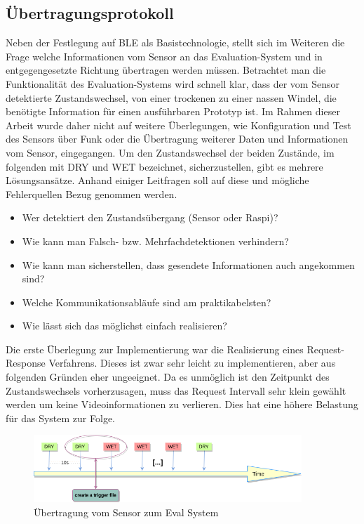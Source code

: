 \subsection{Übertragungsprotokoll}
\label{subsubsec:unser_protokoll}

Neben der Festlegung auf BLE als Basistechnologie, stellt sich im Weiteren die Frage welche Informationen vom Sensor an das Evaluation-System und in entgegengesetzte Richtung übertragen werden müssen. Betrachtet man die Funktionalität des Evaluation-Systems wird schnell klar, dass der vom Sensor detektierte Zustandswechsel, von einer trockenen zu einer nassen Windel, die benötigte Information für einen ausführbaren Prototyp ist. Im Rahmen dieser Arbeit wurde daher nicht auf weitere Überlegungen, wie Konfiguration und Test des Sensors über Funk oder die Übertragung weiterer Daten und Informationen vom Sensor, eingegangen. Um den Zustandswechsel der beiden Zustände, im folgenden mit \glqq{}DRY\grqq{} und \glqq{}WET\grqq{} bezeichnet, sicherzustellen, gibt es mehrere Lösungsansätze. Anhand einiger Leitfragen soll auf diese und mögliche Fehlerquellen Bezug genommen werden.

\begin{itemize}
  \item Wer detektiert den Zustandsübergang (Sensor oder Raspi)?
  \item Wie kann man Falsch- bzw. Mehrfachdetektionen verhindern?
  \item Wie kann man sicherstellen, dass gesendete Informationen auch angekommen sind?
  \item Welche Kommunikationsabläufe sind am praktikabelsten?
  \item Wie lässt sich das möglichst einfach realisieren?
\end{itemize}

Die erste Überlegung zur Implementierung war die Realisierung eines Request-Response Verfahrens. Dieses ist zwar sehr leicht zu implementieren, aber aus folgenden Gründen eher ungeeignet. 
Da es unmöglich ist den Zeitpunkt des Zustandswechsels vorherzusagen, muss das Request Intervall sehr klein gewählt werden um keine Videoinformationen zu verlieren. Dies hat eine höhere Belastung für das System zur Folge. 

\begin{figure}[h]
  \centering
  \includegraphics[width=0.9\textwidth]{includes/kom/graphics/onNotification}
  \caption{Übertragung vom Sensor zum Eval System}
  \label{fig:ble_com_pr}
\end{figure}

